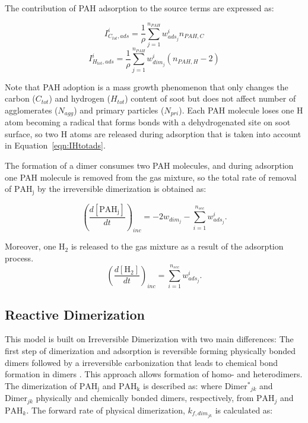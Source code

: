 The contribution of PAH adsorption to the source terms are expressed as:

\begin{equation}
	I^i_{C_{tot},ads} = \frac{1}{\rho}\sum_{j=1}^{n_{PAH}} w^i_{ads_j} n_{PAH,C}
	\label{eqn:ICtotads}
\end{equation}
\begin{equation}
	I^i_{H_{tot},ads} =\frac{1}{\rho} \sum_{j=1}^{n_{PAH}} w^i_{dim_j} (n_{PAH,H}-2)
	\label{eqn:IHtotads}
\end{equation}

Note that PAH adoption is a mass growth phenomenon that only changes the carbon ($C_{tot}$) and hydrogen ($H_{tot}$) content of soot but does not affect number of agglomerates ($N_{agg}$) and primary particles ($N_{pri}$). Each PAH molecule loses one H atom becoming a radical that forms bonds with a dehydrogenated site on soot surface, so two H atoms are released during adsorption that is taken into account in Equation~\eqref{eqn:IHtotads}.

The formation of a dimer consumes two PAH molecules, and during adsorption one PAH molecule is removed from the gas mixture, so the total rate of removal of $\mathrm{PAH_j}$ by the irreversible dimerization is obtained as:

\begin{equation}
	\left(
	\frac{d\left[{\mathrm{PAH_j}}\right]}{dt}
	\right)_{inc}
	= 
	-2w_{dim_j}-\sum_{i=1}^{n_{sec}}w^i_{ads_j}
	\label{eqn:PAHscrub_irrevdim}.
\end{equation}

Moreover, one $\mathrm{H_2}$ is released to the gas mixture as a result of the adsorption process.
\begin{equation}
	\left(
	\frac{d\left[{\mathrm{H_2}}\right]}{dt}
	\right)_{inc}
	= 
	\sum_{i=1}^{n_{sec}}w^i_{ads_j}
	\label{eqn:H2scrub_irrevdim}.
\end{equation}


\subsection{Reactive Dimerization}
\label{sec:reacvdim}

This model is built on Irreversible Dimerization with two main differences: The first step of dimerization and adsorption is reversible forming physically bonded dimers followed by a irreversible carbonization that leads to chemical bond formation in dimers \citep{kholghy2018reactive}. This approach allows formation of homo- and heterodimers. The dimerization of $\mathrm{PAH_j}$ and $\mathrm{PAH_k}$ is described as:
\noindent where $\mathrm{Dimer^*}_{jk}$ and $\mathrm{Dimer}_{jk}$ physically and chemically bonded dimers, respectively, from $\mathrm{PAH}_j$ and $\mathrm{PAH}_k$. The forward rate of physical dimerization, ${k_{f,dim_{jk}}}$ is calculated as:

